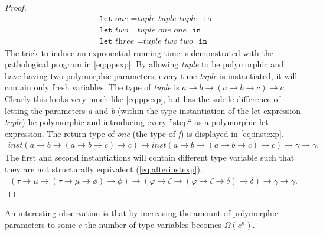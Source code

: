 \documentclass[11pt,oneside,a4paper]{report}
\begin{document}
\begin{proof}
\begin{align}
      &\texttt{let } \textit{one } = \textit{tuple } \textit{tuple } \textit{tuple } \texttt{ in } \tag*{}\\
      &\texttt{let } \textit{two } = \textit{tuple } \textit{one } \textit{one } \texttt{ in } \tag*{}\\
      &\texttt{let } \textit{three } = \textit{tuple } \textit{two } \textit{two } \texttt{ in } \tag*{}
    \end{align}
    The trick to induce an exponential running time is demonstrated with the pathological program in \autoref{eq:ppexp}.
    By allowing \textit{tuple} to be polymorphic and have having two polymorphic parameters, every time \textit{tuple} is instantiated, it will contain only fresh variables.
    The type of \textit{tuple} is $a \rightarrow b \rightarrow (a \rightarrow b \rightarrow c) \rightarrow c$.
    Clearly this looks very much like \autoref{eq:ppexp}, but has the subtle difference of letting the parameters \textit{a} and \textit{b} (within the type instantiation of the let expression \textit{tuple}) be polymorphic and introducing every ''step`` as a polymorphic let expression.
    The return type of \textit{one} (the type of \textit{f}) is displayed in \autoref{eq:instexp}.
    \begin{align}
        \textit{inst}(a \rightarrow b \rightarrow (a \rightarrow b \rightarrow c) \rightarrow c) \rightarrow \textit{inst}(a \rightarrow b \rightarrow (a \rightarrow b \rightarrow c) \rightarrow c) \rightarrow \gamma \rightarrow \gamma.
        \label{eq:instexp}
    \end{align}
    The first and second instantiations will contain different type variable such that they are not structurally equivalent (\autoref{eq:afterinstexp}).
    \begin{align}
        (\tau \rightarrow \mu \rightarrow (\tau \rightarrow \mu \rightarrow \phi) \rightarrow \phi) \rightarrow (\varphi \rightarrow \zeta \rightarrow (\varphi \rightarrow \zeta \rightarrow \delta) \rightarrow \delta) \rightarrow \gamma \rightarrow \gamma.
        \label{eq:afterinstexp}
    \end{align}
\end{proof}
An interesting observation is that by increasing the amount of polymorphic parameters to some $c$ the number of type variables becomes $\Omega(c^n)$.
\end{document}
